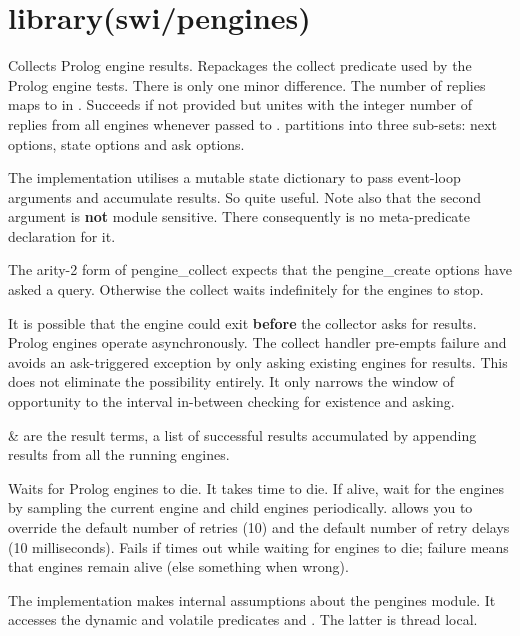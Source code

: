\chapter{library(swi/pengines)}\label{sec:pengines}

\begin{description}
\nodescription
Collects Prolog engine results. Repackages the collect predicate
used by the Prolog engine tests. There is only one minor difference.
The number of replies maps to  in . Succeeds if not
provided but unites with the integer number of replies from all
engines whenever passed to .  partitions into three
sub-sets: next options, state options and ask options.

The implementation utilises a mutable state dictionary to pass
event-loop arguments and accumulate results. So quite useful. Note
also that the second  argument is \textbf{not} module sensitive. There
consequently is no meta-predicate declaration for it.

The arity-2 form of pengine_collect expects that the pengine_create
options have asked a query. Otherwise the collect waits indefinitely
for the engines to stop.

It is possible that the engine could exit \textbf{before} the collector
asks for results. Prolog engines operate asynchronously. The collect
handler pre-empts failure and avoids an ask-triggered exception by
only asking existing engines for results. This does not eliminate
the possibility entirely. It only narrows the window of opportunity
to the interval in-between checking for existence and asking.

\begin{arguments}
 & are the result terms, a list of successful  results
accumulated by appending results from all the running engines. \\
\end{arguments}

Waits for Prolog engines to die. It takes time to die. If alive,
wait for the engines by sampling the current engine and child
engines periodically.  allows you to override the default
number of retries (10) and the default number of retry delays (10
milliseconds). Fails if times out while waiting for engines to die;
failure means that engines remain alive (else something when wrong).

The implementation makes internal assumptions about the pengines
module. It accesses the dynamic and volatile predicates
 and . The latter is thread local.
\end{description}

